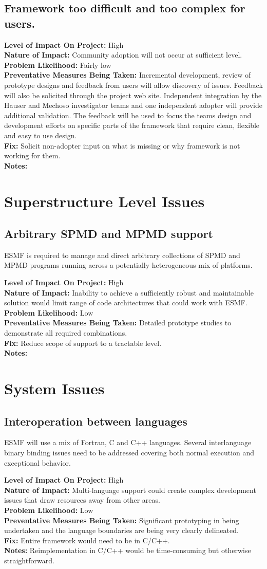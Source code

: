 \documentclass[english]{article}
\newcommand{\req}[1]{\section{\hspace{.2in}#1}}
\newcommand{\sreq}[1]{\subsection{\hspace{.2in}#1}}
\newenvironment
{reqlist}
{\begin{list} {} {} \rm \item[]}
{\end{list}}
\begin{document}
\sreq{Framework too difficult and too complex for users.}
\begin{reqlist}
{\bf Level of Impact On Project:}  High \\
{\bf Nature of Impact:} Community adoption will not occur at sufficient level.\\
{\bf Problem Likelihood:} Fairly low \\
{\bf Preventative Measures Being Taken:}
Incremental development, review of prototype designs and feedback from users
will allow discovery of issues. Feedback will also be solicited through the
project web site. Independent integration by the Hauser and Mechoso investigator
teams and one independent adopter will provide additional validation.
The feedback will be used to focus the teams design and development efforts on 
specific parts of the framework that require clean, flexible and easy to use design.
\\
{\bf Fix:} Solicit non-adopter input on what is missing or why framework is not working for them.\\
{\bf Notes:} \\
\end{reqlist}

\req{Superstructure Level Issues}
\sreq{Arbitrary SPMD and MPMD support}
ESMF is required to manage and direct arbitrary collections of SPMD and MPMD programs 
running across a potentially heterogeneous mix of platforms.
\begin{reqlist}
{\bf Level of Impact On Project:} High \\
{\bf Nature of Impact:} Inability to achieve a sufficiently robust and maintainable
solution would limit range of code architectures that could work with ESMF.\\
{\bf Problem Likelihood:} Low \\
{\bf Preventative Measures Being Taken:} Detailed prototype studies to demonstrate all required
combinations.\\
{\bf Fix:} Reduce scope of support to a tractable level.\\
{\bf Notes:}
\end{reqlist}

\req{System Issues}
\sreq{Interoperation between languages}
ESMF will use a mix of Fortran, C and C++ languages. Several interlanguage binary binding
issues need to be addressed covering both normal execution and exceptional
behavior.
\begin{reqlist}
{\bf Level of Impact On Project:} High \\
{\bf Nature of Impact:} Multi-language support could create complex development
issues that draw resources away from other areas.\\
{\bf Problem Likelihood:} Low\\
{\bf Preventative Measures Being Taken:} Significant prototyping in being undertaken and
the language boundaries are being very clearly delineated.\\
{\bf Fix:} Entire framework would need to be in C/C++.\\
{\bf Notes:} Reimplementation in C/C++ would be time-consuming but
otherwise straightforward.
\end{reqlist}
\end{document}

